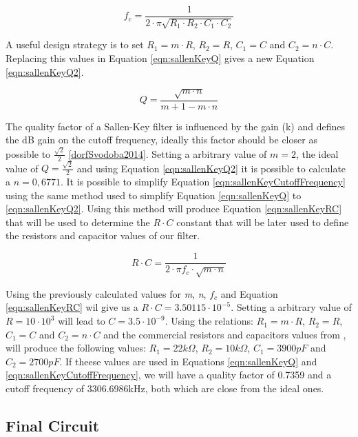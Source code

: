 		\begin{equation}\label{eqn:sallenKeyCutoffFrequency}
			f_{c}=\frac{1}{2 \cdot \pi \sqrt{R_{1} \cdot R_{2} \cdot C_{1} \cdot C_{2}}} 
		\end{equation}


		A useful design strategy is to set $R_{1}= m \cdot R$, $R_{2}=R$, $C_{1}=C$ and $C_{2}= n \cdot C$. Replacing this values in Equation \ref{eqn:sallenKeyQ} gives a new Equation \ref{eqn:sallenKeyQ2}.

		\begin{equation}\label{eqn:sallenKeyQ2}
			Q=\frac{\sqrt{m \cdot n}}{m + 1 - m \cdot n}
		\end{equation}

		The quality factor of a Sallen-Key filter is influenced by the gain (k) and defines the dB gain on the cutoff frequency, ideally this factor should be closer as possible to $\frac{\sqrt{2}}{2}$ \ref{dorfSvodoba2014}. Setting a arbitrary value of $m=2$, the ideal value of $Q=\frac{\sqrt{2}}{2}$ and using Equation \ref{eqn:sallenKeyQ2} it is possible to calculate a $n=0,6771$. It is possible to simplify Equation \ref{eqn:sallenKeyCutoffFrequency} using the same method used to simplify Equation \ref{eqn:sallenKeyQ} to \ref{eqn:sallenKeyQ2}. Using this method will produce Equation \ref{eqn:sallenKeyRC} that will be used to determine the $R \cdot C$ constant that will be later used to define the resistors and capacitor values of our filter. 

		\begin{equation}\label{eqn:sallenKeyRC}
			R \cdot C = \frac{1}{2 \cdot \pi f_{c} \cdot \sqrt{m \cdot n}}
		\end{equation}

		Using the previously calculated values for \textit{m}, \textit{n}, \textit{$f_{c}$} and Equation \ref{eqn:sallenKeyRC} wil give us a $R \cdot C = 3.50115 \cdot 10^{-5}$. Setting a arbitrary value of $R=10 \cdot 10^{3}$ will lead to $C=3.5 \cdot 10^{-9}$. Using the relations: $R_{1}= m \cdot R$, $R_{2}=R$, $C_{1}=C$ and $C_{2}= n \cdot C$ and the commercial resistors and capacitors values from \cite{burgess2015pwm}, will produce the following values: $R_{1}= 22k\Omega$, $R_{2}=10k\Omega$, $C_{1}=3900pF$ and $C_{2}= 2700pF$. If theese values are used in Equations \ref{eqn:sallenKeyQ} and \ref{eqn:sallenKeyCutoffFrequency}, we will have a  quality factor of 0.7359 and a cutoff frequency of 3306.6986kHz, both which are close from the ideal ones.


	\subsection{Final Circuit}
	
